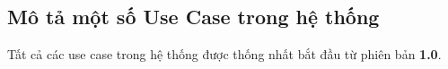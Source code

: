 \subsection{Mô tả một số Use Case trong hệ thống}
\setcounter{subsubsection}{0}
\setcounter{figure}{0}
Tất cả các use case trong hệ thống được thống nhất bắt đầu từ phiên bản
\textbf{1.0}.
































